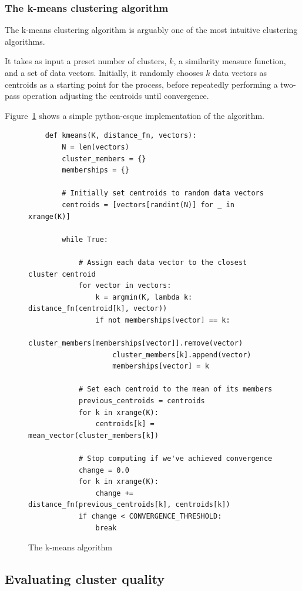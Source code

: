 \subsubsection{The k-means clustering algorithm}
\label{subs:kmeans}

The k-means clustering algorithm is arguably one of the most intuitive clustering algorithms.

It takes as input a preset number of clusters, $k$, a similarity measure function, and a set of data vectors. Initially, it randomly chooses $k$ data vectors as centroids as a starting point for the process, before repeatedly performing a two-pass operation adjusting the centroids until convergence.

Figure~\ref{fig:k-means} shows a simple python-esque implementation of the algorithm.

\begin{figure}[h]
  \begin{verbatim}
    def kmeans(K, distance_fn, vectors):
        N = len(vectors)
        cluster_members = {}
        memberships = {}

        # Initially set centroids to random data vectors
        centroids = [vectors[randint(N)] for _ in xrange(K)]

        while True:

            # Assign each data vector to the closest cluster centroid
            for vector in vectors:
                k = argmin(K, lambda k: distance_fn(centroid[k], vector))
                if not memberships[vector] == k:
                    cluster_members[memberships[vector]].remove(vector)
                    cluster_members[k].append(vector)
                    memberships[vector] = k

            # Set each centroid to the mean of its members
            previous_centroids = centroids
            for k in xrange(K):
                centroids[k] = mean_vector(cluster_members[k])

            # Stop computing if we've achieved convergence
            change = 0.0
            for k in xrange(K):
                change += distance_fn(previous_centroids[k], centroids[k])
            if change < CONVERGENCE_THRESHOLD:
                break
  \end{verbatim}

  \caption{The k-means algorithm}
  \label{fig:k-means}
\end{figure}

\subsection{Evaluating cluster quality}
\label{sub:evaluating_clusters}

